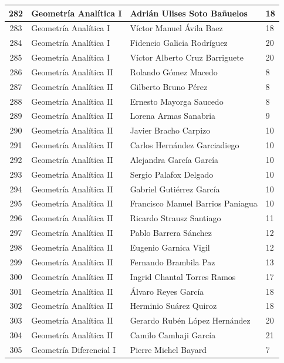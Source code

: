 {\begin{longtable}{|c|p{6.5cm}|p{5cm}|p{1.5cm}|}
  282 & Geometría Analítica I & Adrián Ulises Soto Bañuelos & 18 \\ \hline
  283 & Geometría Analítica I & Víctor Manuel Ávila Baez & 18 \\ \hline
  284 & Geometría Analítica I & Fidencio Galicia Rodríguez & 20 \\ \hline
  285 & Geometría Analítica I & Víctor Alberto Cruz Barriguete & 20 \\ \hline
  286 & Geometría Analítica II & Rolando Gómez Macedo & 8 \\ \hline
  287 & Geometría Analítica II & Gilberto Bruno Pérez & 8 \\ \hline
  288 & Geometría Analítica II & Ernesto Mayorga Saucedo & 8 \\ \hline
  289 & Geometría Analítica II & Lorena Armas Sanabria & 9 \\ \hline
  290 & Geometría Analítica II & Javier Bracho Carpizo & 10 \\ \hline
  291 & Geometría Analítica II & Carlos Hernández Garciadiego & 10 \\ \hline
  292 & Geometría Analítica II & Alejandra García García & 10 \\ \hline
  293 & Geometría Analítica II & Sergio Palafox Delgado & 10 \\ \hline
  294 & Geometría Analítica II & Gabriel Gutiérrez García & 10 \\ \hline
  295 & Geometría Analítica II & Francisco Manuel Barrios Paniagua & 10 \\ \hline
  296 & Geometría Analítica II & Ricardo Strausz Santiago & 11 \\ \hline
  297 & Geometría Analítica II & Pablo Barrera Sánchez & 12 \\ \hline
  298 & Geometría Analítica II & Eugenio Garnica Vigil & 12 \\ \hline
  299 & Geometría Analítica II & Fernando Brambila Paz & 13 \\ \hline
  300 & Geometría Analítica II & Ingrid Chantal Torres Ramos & 17 \\ \hline
  301 & Geometría Analítica II & Álvaro Reyes García & 18 \\ \hline
  302 & Geometría Analítica II & Herminio Suárez Quiroz & 18 \\ \hline
  303 & Geometría Analítica II & Gerardo Rubén López Hernández & 20 \\ \hline
  304 & Geometría Analítica II & Camilo Camhaji García & 21 \\ \hline
  305 & Geometría Diferencial I & Pierre Michel Bayard & 7 \\ \hline

\end{longtable}}
